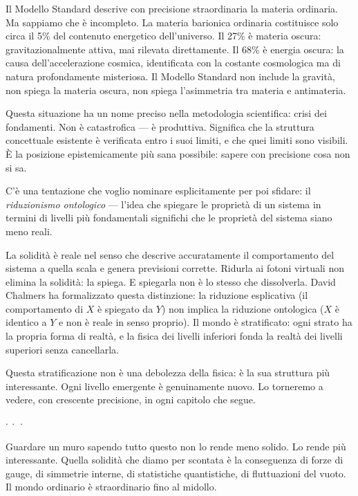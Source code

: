 \documentclass[12pt,a4paper,openany]{book}
\newcommand{\sezione}[1]{\vspace{1.2em}{\large\bfseries #1}\vspace{0.5em}\par}
\newcommand{\puntini}{\begin{center}$\cdot\ \cdot\ \cdot$\end{center}\vspace{0.3em}}
\begin{document}
\sezione{Oltre il Modello Standard}

Il Modello Standard descrive con precisione straordinaria la materia ordinaria. Ma sappiamo che è incompleto. La materia barionica ordinaria costituisce solo circa il 5\% del contenuto energetico dell'universo. Il 27\% è materia oscura: gravitazionalmente attiva, mai rilevata direttamente. Il 68\% è energia oscura: la causa dell'accelerazione cosmica, identificata con la costante cosmologica ma di natura profondamente misteriosa. Il Modello Standard non include la gravità, non spiega la materia oscura, non spiega l'asimmetria tra materia e antimateria.

Questa situazione ha un nome preciso nella metodologia scientifica: crisi dei fondamenti. Non è catastrofica — è produttiva. Significa che la struttura concettuale esistente è verificata entro i suoi limiti, e che quei limiti sono visibili. È la posizione epistemicamente più sana possibile: sapere con precisione cosa non si sa.

\sezione{Una nota sul riduzionismo}

C'è una tentazione che voglio nominare esplicitamente per poi sfidare: il \textit{riduzionismo ontologico} — l'idea che spiegare le proprietà di un sistema in termini di livelli più fondamentali significhi che le proprietà del sistema siano meno reali.

La solidità è reale nel senso che descrive accuratamente il comportamento del sistema a quella scala e genera previsioni corrette. Ridurla ai fotoni virtuali non elimina la solidità: la spiega. E spiegarla non è lo stesso che dissolverla. David Chalmers ha formalizzato questa distinzione: la riduzione esplicativa (il comportamento di $X$ è spiegato da $Y$) non implica la riduzione ontologica ($X$ è identico a $Y$ e non è reale in senso proprio). Il mondo è stratificato: ogni strato ha la propria forma di realtà, e la fisica dei livelli inferiori fonda la realtà dei livelli superiori senza cancellarla.

Questa stratificazione non è una debolezza della fisica: è la sua struttura più interessante. Ogni livello emergente è genuinamente nuovo. Lo torneremo a vedere, con crescente precisione, in ogni capitolo che segue.

\puntini

Guardare un muro sapendo tutto questo non lo rende meno solido. Lo rende più interessante. Quella solidità che diamo per scontata è la conseguenza di forze di gauge, di simmetrie interne, di statistiche quantistiche, di fluttuazioni del vuoto. Il mondo ordinario è straordinario fino al midollo.
\end{document}
